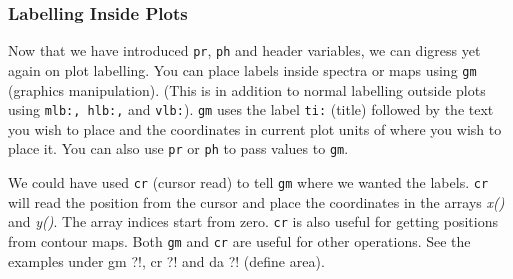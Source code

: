 \subsubsection{Labelling Inside Plots}
 
Now that we have introduced {\tt pr}, {\tt ph} and header variables, we can
digress yet again on plot labelling.  
You can place labels inside spectra or maps using {\tt gm} (graphics manipulation).
(This is in addition to normal labelling outside plots using 
{\tt mlb:, hlb:,} and {\tt vlb:}).  {\tt gm} uses the label {\tt ti:} (title)
followed by the text you wish to place and the coordinates in current plot
units of where you wish to place it. 
\smallskip\noindent
You can also use {\tt pr} or {\tt ph} to pass values to {\tt gm}.

We could have used {\tt cr} (cursor read) to tell {\tt gm} where we wanted
the labels. {\tt cr} will read the position from the cursor and place the
coordinates in the arrays {\it x()\/} and {\it y()\/}. The array indices start
from zero. 
\smallskip\noindent
{\tt cr} is also useful for getting positions from contour maps.
\smallskip\noindent 
Both {\tt gm} and {\tt cr} are useful for other operations. See the
examples under {\us gm ?!}, {\us cr ?!} and {\us da ?!} (define area).

